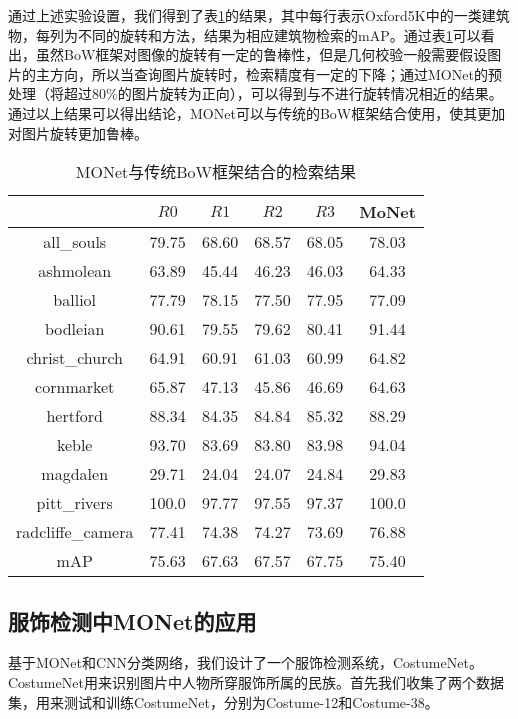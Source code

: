通过上述实验设置，我们得到了表\ref{tab:monet_bow}的结果，其中每行表示Oxford5K中的一类建筑物，每列为不同的旋转和方法，结果为相应建筑物检索的mAP。通过表\ref{tab:monet_bow}可以看出，虽然BoW框架对图像的旋转有一定的鲁棒性，但是几何校验一般需要假设图片的主方向，所以当查询图片旋转时，检索精度有一定的下降；通过MONet的预处理（将超过80\%的图片旋转为正向），可以得到与不进行旋转情况相近的结果。通过以上结果可以得出结论，MONet可以与传统的BoW框架结合使用，使其更加对图片旋转更加鲁棒。
\begin{table}
	\begin{center}
		\begin{tabular}{|c|c|c|c|c|c|}
			\hline
						& $R0$  & $R1$ & $R2$ & $R3$ & MoNet \\
			\hline
			all\_souls	& 79.75 & 68.60 & 68.57 & 68.05 & 78.03\\
			\hline
			ashmolean   & 63.89 & 45.44 & 46.23 & 46.03 & 64.33\\
			\hline
			balliol     & 77.79 & 78.15 & 77.50 & 77.95 & 77.09\\
			\hline
			bodleian    & 90.61 & 79.55 & 79.62 & 80.41 & 91.44\\
			\hline
			christ\_church&64.91 & 60.91& 61.03 & 60.99 & 64.82\\
			\hline
			cornmarket  & 65.87 & 47.13 & 45.86 & 46.69 & 64.63\\
			\hline
			hertford    & 88.34 & 84.35 & 84.84 & 85.32 & 88.29\\
			\hline
			keble       & 93.70 & 83.69 & 83.80 & 83.98 & 94.04\\
			\hline
			magdalen    & 29.71 & 24.04 & 24.07 & 24.84 & 29.83\\
			\hline
			pitt\_rivers& 100.0 & 97.77 & 97.55 & 97.37 & 100.0\\
			\hline
			radcliffe\_camera& 77.41 & 74.38 & 74.27 & 73.69 &76.88\\
			\hline
			mAP         & 75.63 & 67.63 & 67.57 & 67.75 & 75.40\\
			\hline
		\end{tabular}
	\end{center}
	\caption{MONet与传统BoW框架结合的检索结果}
	\label{tab:monet_bow}
\end{table}

\subsection{服饰检测中MONet的应用}

基于MONet和CNN分类网络，我们设计了一个服饰检测系统，CostumeNet。CostumeNet用来识别图片中人物所穿服饰所属的民族。首先我们收集了两个数据集，用来测试和训练CostumeNet，分别为Costume-12和Costume-38。

